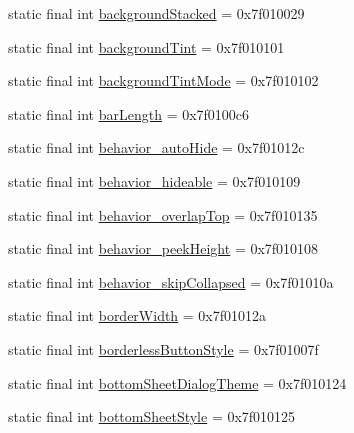 \begin{CompactItemize}
static final int \hyperlink{classandroid_1_1support_1_1graphics_1_1drawable_1_1animated_1_1_r_1_1attr_6144be454eb022763bde8d7ff8829463}{backgroundStacked} = 0x7f010029
\item 
static final int \hyperlink{classandroid_1_1support_1_1graphics_1_1drawable_1_1animated_1_1_r_1_1attr_d3798f86247e99913b5a16af3da43b0b}{backgroundTint} = 0x7f010101
\item 
static final int \hyperlink{classandroid_1_1support_1_1graphics_1_1drawable_1_1animated_1_1_r_1_1attr_ac01bea54caa7ec5ab045ba11322401e}{backgroundTintMode} = 0x7f010102
\item 
static final int \hyperlink{classandroid_1_1support_1_1graphics_1_1drawable_1_1animated_1_1_r_1_1attr_a2749e12d7418b586c94fb6de3b47193}{barLength} = 0x7f0100c6
\item 
static final int \hyperlink{classandroid_1_1support_1_1graphics_1_1drawable_1_1animated_1_1_r_1_1attr_e141efd98d95c1adf0205d4886320d01}{behavior\_\-autoHide} = 0x7f01012c
\item 
static final int \hyperlink{classandroid_1_1support_1_1graphics_1_1drawable_1_1animated_1_1_r_1_1attr_44af5fc84823c0faec075f4cf5be9d0b}{behavior\_\-hideable} = 0x7f010109
\item 
static final int \hyperlink{classandroid_1_1support_1_1graphics_1_1drawable_1_1animated_1_1_r_1_1attr_6146f207eb774989bd83b94367b72c32}{behavior\_\-overlapTop} = 0x7f010135
\item 
static final int \hyperlink{classandroid_1_1support_1_1graphics_1_1drawable_1_1animated_1_1_r_1_1attr_0d06a0a44157ac3e36911e1a996264ab}{behavior\_\-peekHeight} = 0x7f010108
\item 
static final int \hyperlink{classandroid_1_1support_1_1graphics_1_1drawable_1_1animated_1_1_r_1_1attr_29c1ea3fea3689f2e707ba8708bc8915}{behavior\_\-skipCollapsed} = 0x7f01010a
\item 
static final int \hyperlink{classandroid_1_1support_1_1graphics_1_1drawable_1_1animated_1_1_r_1_1attr_b0062829e23e328beaca71a5910c9588}{borderWidth} = 0x7f01012a
\item 
static final int \hyperlink{classandroid_1_1support_1_1graphics_1_1drawable_1_1animated_1_1_r_1_1attr_a51d6a1e8c287a4df281a6b8fe0ffdb8}{borderlessButtonStyle} = 0x7f01007f
\item 
static final int \hyperlink{classandroid_1_1support_1_1graphics_1_1drawable_1_1animated_1_1_r_1_1attr_f7934eca76d64711285ccddc61d97a4b}{bottomSheetDialogTheme} = 0x7f010124
\item 
static final int \hyperlink{classandroid_1_1support_1_1graphics_1_1drawable_1_1animated_1_1_r_1_1attr_6f4df8146d62d10f50dbbac0fd1aae3d}{bottomSheetStyle} = 0x7f010125

\end{CompactItemize}
